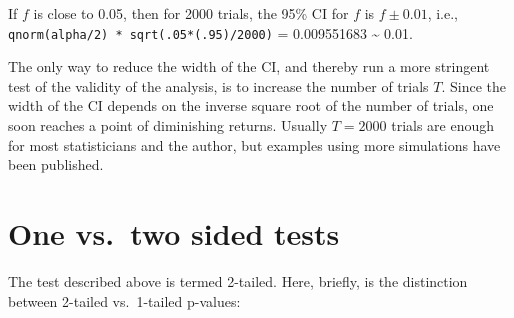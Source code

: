 \documentclass[
]{book}
\begin{document}
If \(f\) is close to 0.05, then for 2000 trials, the 95\% CI for \(f\) is \(f \pm 0.01\), i.e., \texttt{qnorm(alpha/2)\ *\ sqrt(.05*(.95)/2000)} = 0.009551683 \textasciitilde{} 0.01.

The only way to reduce the width of the CI, and thereby run a more stringent test of the validity of the analysis, is to increase the number of trials \(T\). Since the width of the CI depends on the inverse square root of the number of trials, one soon reaches a point of diminishing returns. Usually \(T = 2000\) trials are enough for most statisticians and the author, but examples using more simulations have been published.

\hypertarget{one-vs.-two-sided-tests}{%
\section{One vs.~two sided tests}\label{one-vs.-two-sided-tests}}

The test described above is termed 2-tailed. Here, briefly, is the distinction between 2-tailed vs.~1-tailed p-values:
\end{document}
